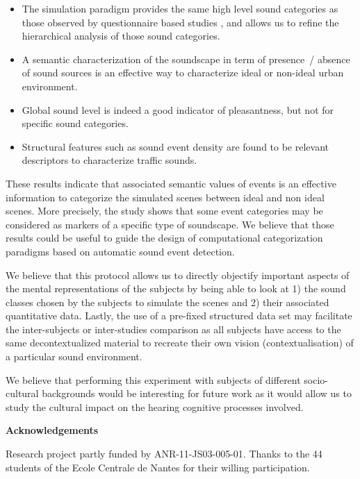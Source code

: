 \documentclass[12pt, titlepage, reqno]{article} %
\begin{document}
\begin{itemize}
\item The simulation paradigm provides the same high level sound categories as those observed by questionnaire based studies \cite{guastavino_ideal_2006}, and allows us to refine the hierarchical analysis of those sound categories.
\item A semantic characterization of the soundscape in term of presence~/ absence of sound sources is an effective way to characterize ideal or non-ideal urban environment.
\item Global sound level is indeed a good indicator of pleasantness, but not for specific sound categories.
\item Structural features such as sound event density are found to be relevant descriptors to characterize traffic sounds.
\end{itemize} 

These results indicate that associated semantic values of events is an effective information to categorize the simulated scenes between ideal and non ideal scenes. More precisely, the study shows that some event categories may be considered as markers of a specific type of soundscape. We believe that those results could be useful to guide the design of computational categorization paradigms based on automatic sound event detection.

We believe that this protocol allows us to directly objectify important aspects of the mental representations of the subjects by being able to look at 1) the sound classes chosen by the subjects to simulate the scenes and 2) their associated quantitative data.  Lastly, the use of a pre-fixed structured data set may facilitate the inter-subjects or inter-studies comparison as all subjects have access to the same decontextualized material to recreate their own vision (contextualisation) of a particular sound environment.  

We believe that performing this experiment with subjects of different socio-cultural backgrounds would be interesting for future work as it would allow us to study the cultural impact on the hearing cognitive processes involved.

 \noindent \textbf{Acknowledgements}
 
 \setlength{\parindent}{0.7cm} 

Research project partly funded by ANR-11-JS03-005-01. Thanks to the 44 students of the Ecole Centrale de Nantes for their willing participation.
\end{document}
